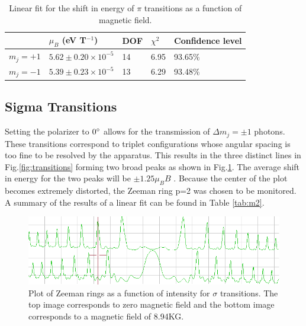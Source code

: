 \documentclass[12pt]{article}
\begin{document}
\begin{table}[h!]\centering
\begin{tabular}{|p{3cm} |p{3cm}|p{2cm}|p{2.5cm}|p{3.25cm}|}
 \hline
 &  $\mu_B$ (eV T${}^{-1}$)& DOF & $\chi^2$ & Confidence level \\
 \hline
$m_j = +1$ &  $5.62 \pm 0.20 \times 10^{-5}$ &  14 & 6.95 & 93.65\%\\
 \hline
$m_j = -1$ & $5.39 \pm 0.23 \times 10^{-5}$ & 13  & 6.29 & 93.48\%\\
 \hline
\end{tabular}
\def\sym#1{\ifmmode^{#1}\else\(^{#1}\)\fi}
\caption{Linear fit for the shift in energy of $\pi$ transitions as a function of magnetic field.}
\label{tab:m1}
\end{table}


\subsection{Sigma Transitions}
Setting the polarizer to $0\degree$ allows for the transmission of $\Delta m_j = \pm 1$ photons. These transitions correspond to triplet configurations whose angular spacing is too fine to be resolved by the apparatus. This results in the three distinct lines in Fig.\ref{fig:transitions} forming two broad peaks as shown in Fig.\ref{fig:0split}. The average shift in energy for the two peaks will be $\pm 1.25 \mu_B B$ \cite{manual}. Because the center of the plot becomes extremely distorted, the Zeeman ring p=2 was chosen to be monitored. A summary of the results of a linear fit can be found in Table \ref{tab:m2}. 


\begin{figure}[h!]\centering
 \quad \includegraphics[width=01\textwidth]{0split}
\caption{Plot of Zeeman rings as a function of intensity for $\sigma$ transitions. The top image corresponds to zero magnetic field and the bottom image corresponds to a magnetic field of 8.94KG.  }
\label{fig:0split}
\end{figure}
\end{document}
